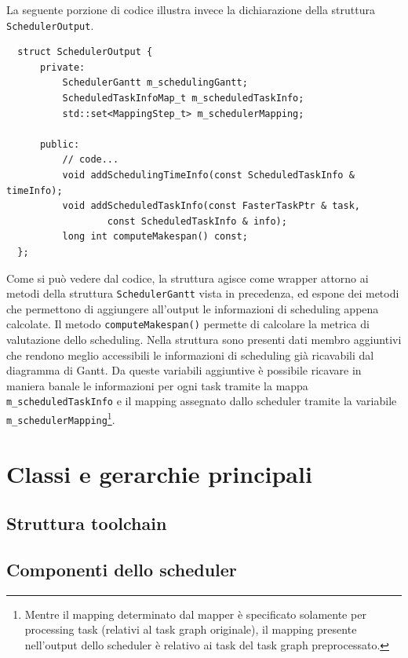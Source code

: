 La seguente porzione di codice illustra invece la dichiarazione della struttura 
\verb+SchedulerOutput+.
\newline
\begin{verbatim}
  struct SchedulerOutput {
      private:
          SchedulerGantt m_schedulingGantt;
          ScheduledTaskInfoMap_t m_scheduledTaskInfo;
          std::set<MappingStep_t> m_schedulerMapping;

      public:
          // code...
          void addSchedulingTimeInfo(const ScheduledTaskInfo & timeInfo);
          void addScheduledTaskInfo(const FasterTaskPtr & task,
                  const ScheduledTaskInfo & info);
          long int computeMakespan() const;
  };
\end{verbatim}
Come si può vedere dal codice, la struttura agisce come wrapper attorno ai 
metodi della struttura \verb+SchedulerGantt+ vista in precedenza, ed espone dei 
metodi che permettono di aggiungere all'output le informazioni di scheduling 
appena calcolate. Il metodo \verb+computeMakespan()+ permette di calcolare la 
metrica di valutazione dello scheduling. Nella struttura sono presenti dati 
membro aggiuntivi che rendono meglio accessibili le informazioni di scheduling 
già ricavabili dal diagramma di Gantt. Da queste variabili aggiuntive è 
possibile ricavare in maniera banale le informazioni per ogni task tramite la 
mappa \verb+m_scheduledTaskInfo+ e il mapping assegnato dallo scheduler tramite 
la variabile \verb+m_schedulerMapping+\footnote{Mentre il mapping determinato 
dal mapper è specificato solamente per processing task (relativi al task 
graph originale), il mapping presente nell'output dello scheduler è relativo ai 
task del task graph preprocessato.}.


\section{Classi e gerarchie principali}
\label{sec:classiGerarchie}


\subsection{Struttura toolchain}
\label{subsec:strutturaToolchain}


\subsection{Componenti dello scheduler}
\label{subsec:componentiScheduler}

